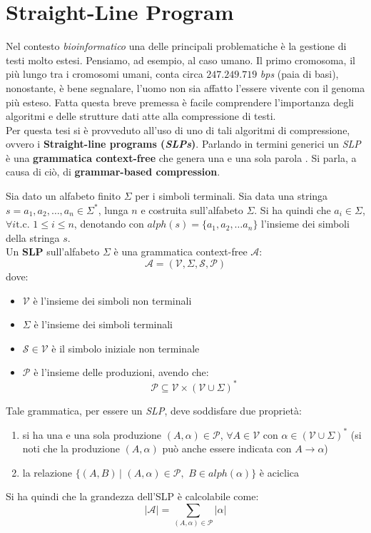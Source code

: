 \section{Straight-Line Program}
Nel contesto \textit{bioinformatico} una delle principali problematiche è la
gestione di testi molto estesi. Pensiamo, ad esempio, al caso umano. Il primo
cromosoma, il più lungo tra i cromosomi umani, conta circa $247.249.719$
\textit{bps} (paia di basi), nonostante, è bene segnalare, l'uomo
non sia affatto l'essere vivente con il genoma più esteso. Fatta questa breve
premessa è facile comprendere l'importanza degli algoritmi e delle strutture
dati atte alla compressione di testi.\\
Per questa tesi si è provveduto all'uso di uno di tali algoritmi di
compressione, ovvero i \textbf{Straight-line programs (\textit{SLPs})}. Parlando
in termini generici un \textit{SLP} è una \textbf{grammatica context-free} che
genera una e una sola parola \cite{slpsurvey}. Si parla, a causa di ciò, di
\textbf{grammar-based compression}.
\begin{definizione}
  Sia dato un alfabeto finito $\Sigma$ per i simboli terminali. Sia data una
  stringa $s=a_1,a_2,\ldots, a_n\in\Sigma^{*}$, lunga $n$ e costruita
  sull'alfabeto $\Sigma$. Si ha quindi che $a_i\in\Sigma$, $\forall i \mbox{
    t.c. }1\leq i\leq n$, denotando con $alph(s)=\{a_1,a_2,\ldots
  a_n\}$ l'insieme dei simboli della stringa $s$.\\
  Un \textbf{SLP} sull'alfabeto $\Sigma$ è una grammatica context-free
  $\mathcal{A}$: 
  \[\mathcal{A}=\left(\mathcal{V}, \Sigma, \mathcal{S}, \mathcal{P}\right)\]
  dove:
  \begin{itemize}
    \item $\mathcal{V}$ è l'insieme dei simboli non terminali
    \item $\Sigma$ è l'insieme dei simboli terminali
    \item $\mathcal{S}\in \mathcal{V}$ è il simbolo iniziale non terminale
    \item $\mathcal{P}$ è l'insieme delle produzioni, avendo che:
    \[\mathcal{P}\subseteq \mathcal{V}\times\left(\mathcal{V}\cup
        \Sigma\right)^{*}\] 
  \end{itemize}
  Tale grammatica, per essere un \textit{SLP}, deve soddisfare due proprietà:
  \begin{enumerate}
    \item si ha una e una sola produzione $(A,\alpha)\in \mathcal{P}$, $\forall
    A\in \mathcal{V}$ con $\alpha\in \left(\mathcal{V}\cup\Sigma\right)^{*}$ (si
    noti che la produzione $(A,\alpha)$ può anche essere indicata con
    $A\to\alpha$) 
    \item la relazione $\{(A,B)\,|\,\,(A,\alpha)\in\mathcal{P},\,\,B\in
    alph(\alpha)\}$ è aciclica
  \end{enumerate}
  Si ha quindi che la grandezza dell'SLP è calcolabile come:
  \[|\mathcal{A}| = \sum_{(A,\alpha)\in\mathcal{P}}|\alpha|\]
\end{definizione}
